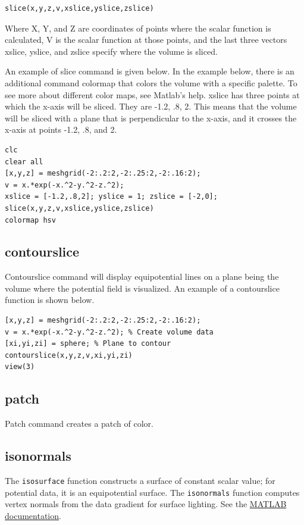 \documentclass{ximera}
\begin{document}
\begin{verbatim}
slice(x,y,z,v,xslice,yslice,zslice)
\end{verbatim}

Where X, Y, and Z are coordinates of points where the scalar function is calculated, V is the scalar function at those points, and the last three vectors xslice, yslice, and zslice  specify where the volume is sliced.

An example of slice command is given below. In the example below, there is an additional command colormap that colors the volume with a specific palette. To see more about different color maps, see Matlab's help. xslice has three points at which the x-axis will be sliced. They are -1.2, .8, 2. This means that the volume will be sliced with a plane that is perpendicular to the x-axis, and it crosses the x-axis at points -1.2, .8, and 2.
 
\begin{verbatim}
clc
clear all
[x,y,z] = meshgrid(-2:.2:2,-2:.25:2,-2:.16:2);
v = x.*exp(-x.^2-y.^2-z.^2);
xslice = [-1.2,.8,2]; yslice = 1; zslice = [-2,0];
slice(x,y,z,v,xslice,yslice,zslice)
colormap hsv
\end{verbatim}

\subsection{contourslice}

 Contourslice command will display equipotential lines on a plane being the volume where the potential field is visualized. An example of a contourslice function is shown below.

\begin{verbatim}
[x,y,z] = meshgrid(-2:.2:2,-2:.25:2,-2:.16:2);
v = x.*exp(-x.^2-y.^2-z.^2); % Create volume data
[xi,yi,zi] = sphere; % Plane to contour
contourslice(x,y,z,v,xi,yi,zi)
view(3)
\end{verbatim}

\subsection{patch}

Patch command creates a patch of color.


\subsection{isonormals}

The \texttt{isosurface} function constructs a surface of constant scalar value; for potential data, it is an equipotential surface. The \texttt{isonormals} function computes vertex normals from the data gradient for surface lighting. See the \href{https://www.mathworks.com/help/matlab/ref/isonormals.html}{MATLAB documentation}.
\end{document}

